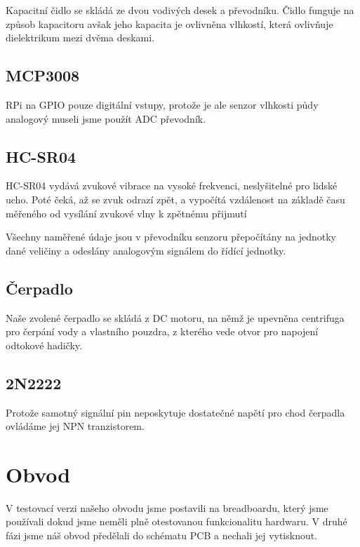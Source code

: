\documentclass[11pt,a4paper]{article}
\begin{document}
Kapacitní čidlo se skládá ze dvou vodivých desek a převodníku. Čidlo funguje na způsob kapacitoru avšak jeho kapacita je ovlivněna vlhkostí, která ovlivňuje dielektrikum mezi dvěma deskami.

\subsection*{MCP3008}

RPi na GPIO pouze digitální vstupy, protože je ale senzor vlhkosti půdy analogový museli jsme použít ADC převodník.

\subsection*{HC-SR04}

HC-SR04 vydává zvukové vibrace na vysoké frekvenci, neslyšitelné pro lidské ucho. Poté čeká, až se zvuk odrazí zpět, a vypočítá vzdálenost na základě času měřeného od vysílání zvukové vlny k zpětnému přijmutí

Všechny naměřené údaje jsou v převodníku senzoru přepočítány na jednotky dané veličiny a odeslány analogovým signálem do řídící jednotky.

\subsection*{Čerpadlo}

Naše zvolené čerpadlo se skládá z DC motoru, na němž je upevněna centrifuga pro čerpání vody a vlastního pouzdra, z kterého vede otvor pro napojení odtokové hadičky.

\subsection*{2N2222}

Protože samotný signální pin neposkytuje dostatečné napětí pro chod čerpadla ovládáme jej NPN tranzistorem.

\section*{Obvod}

V testovací verzi našeho obvodu jsme postavili na breadboardu, který jsme používali dokud jsme neměli plně otestovanou funkcionalitu hardwaru. V druhé fázi jsme náš obvod předělali do schématu PCB a nechali jej vytisknout.
\end{document}
